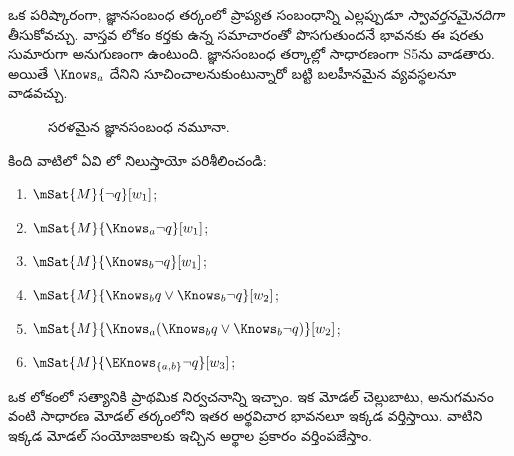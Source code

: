 \documentclass[../../../include/open-logic-section]{subfiles}
\begin{document}
ఒక పరిష్కారంగా, జ్ఞానసంబంధ తర్కంలో ప్రాప్యత సంబంధాన్ని
ఎల్లప్పుడూ \emph{స్వావర్తనమైనదిగా} తీసుకోవచ్చు.
వాస్తవ లోకం కర్తకు ఉన్న సమాచారంతో పొసగుతుందనే భావనకు
ఈ షరతు సుమారుగా అనుగుణంగా ఉంటుంది. జ్ఞానసంబంధ తర్కాల్లో
సాధారణంగా S5ను వాడతారు. అయితే $\Knows_a$ దేనిని
సూచించాలనుకుంటున్నారో బట్టి బలహీనమైన వ్యవస్థలనూ వాడవచ్చు.

\begin{figure}
  \begin{center}
  \end{center}
  \caption{సరళమైన జ్ఞానసంబంధ నమూనా.}
\end{figure}

\begin{prob}
  కింది వాటిలో ఏవి
  లో నిలుస్తాయో పరిశీలించండి:
  \begin{enumerate}
    \item $\mSat{M}{\lnot q}[w_1]$;
    \item $\mSat{M}{\Knows_a \lnot q}[w_1]$;
    \item $\mSat{M}{\Knows_b \lnot q}[w_1]$;
    \item $\mSat{M}{\Knows_b q \lor \Knows_b \lnot q}[w_2]$;
    \item $\mSat{M}{\Knows_a( \Knows_b q \lor \Knows_b \lnot q)}[w_2]$;
    \item $\mSat{M}{\EKnows_{\{a,b\}} \lnot q}[w_3]$;
    \end{enumerate}
\end{prob}

ఒక లోకంలో సత్యానికి ప్రాథమిక నిర్వచనాన్ని
ఇచ్చాం. ఇక మోడల్ చెల్లుబాటు, అనుగమనం వంటి సాధారణ
మోడల్ తర్కంలోని ఇతర అర్థవిచార భావనలూ ఇక్కడ వర్తిస్తాయి.
వాటిని ఇక్కడ మోడల్ సంయోజకాలకు ఇచ్చిన అర్థాల ప్రకారం వర్తింపజేస్తాం.
\end{document}
